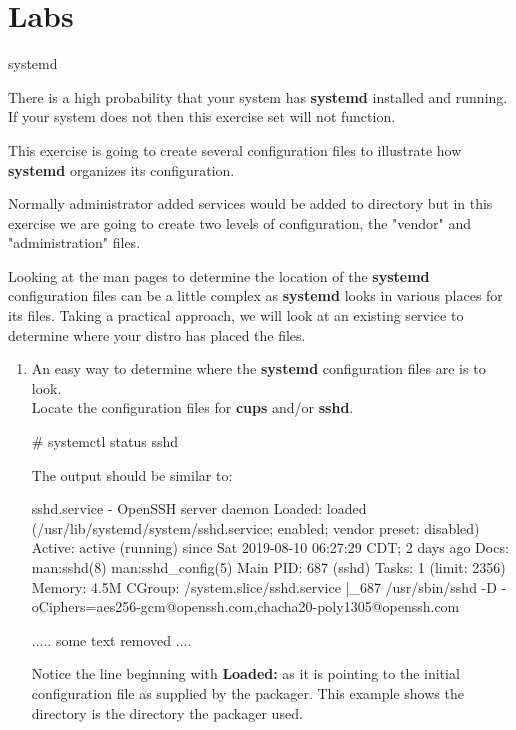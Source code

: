 \clearpage\section{Labs}\begin{Lab}

\begin{exe} {systemd}

	There is a high probability that your system has \textbf{systemd}
	installed and running. If your system does not then this exercise 
	set will not function.

	This exercise is going to create several configuration files 
	to illustrate how \textbf{systemd} organizes its configuration. 

	Normally administrator added services would be added to  
	directory but in this exercise we are going to create two levels of 
	configuration, the "vendor" and "administration" files.  

	Looking at the man pages to determine the location of the 
	\textbf{systemd} configuration files can be a little complex as \textbf{systemd}
	looks in various places  for its files. Taking a practical 
	approach, we will look at an existing service to determine where 
	your distro has placed the files. 
	
	
      \begin{enumerate}
	      \item An easy way to determine where the \textbf{systemd}
		    configuration files are is to look. \\
		      Locate the configuration files for \textbf{cups} and/or
		      \textbf{sshd}.
		 	\begin{raw}
# systemctl status sshd
			\end{raw}
			The output should be similar to: 
			\begin{raw}
sshd.service - OpenSSH server daemon
   Loaded: loaded (/usr/lib/systemd/system/sshd.service; enabled; vendor preset: disabled)
   Active: active (running) since Sat 2019-08-10 06:27:29 CDT; 2 days ago
     Docs: man:sshd(8)
           man:sshd_config(5)
 Main PID: 687 (sshd)
    Tasks: 1 (limit: 2356)
   Memory: 4.5M
   CGroup: /system.slice/sshd.service
           |_687 /usr/sbin/sshd -D -oCiphers=aes256-gcm@openssh.com,chacha20-poly1305@openssh.com
	
..... some text removed .... 
			
			\end{raw}
	Notice the line beginning with \textbf{Loaded:} as it is 
		      pointing to the initial configuration file 
		      as supplied by the packager. This example
		      shows the directory  
		     is the directory the packager used.  \\  
		   

\end{enumerate}
\end{exe}
\end{Lab}
